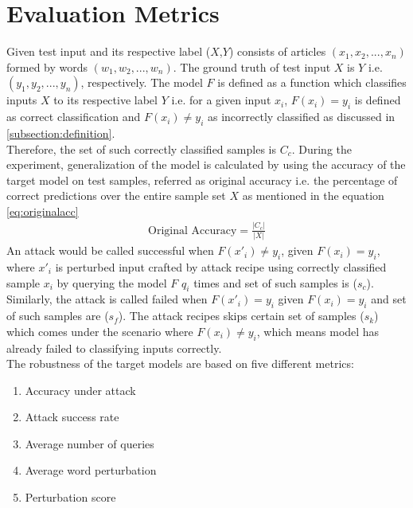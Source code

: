 \documentclass[%
	BCOR=8mm, %
	DIV=12,
	toc=bibliography, %
	toc=listof, %
	oneside, %
	egregdoesnotlikesansseriftitles, %
	]{scrbook}
\begin{document}
\section{Evaluation Metrics}
\label{section:metrics}
Given test input and its respective label ($X$,$Y$) consists of articles $(x_{1},x_{2},...,x_{n})$ formed by words $(w_{1},w_{2},...,w_{n})$. The ground truth of test input $X$ is $Y$ i.e. $(y_{1},y_{2},...,y_{n})$, respectively. The model $F$ is defined as a function which classifies inputs $X$ to its respective label $Y$ i.e. for a given input $x_{i}$, $F(x_{i})=y_{i}$ is defined as correct classification and $F(x_{i})\not=y_{i}$  as incorrectly classified as discussed in \ref{subsection:definition}. \\
Therefore, the set of such correctly classified samples is  $C_{c}$.  During the experiment, generalization of the model is calculated by using the accuracy of the target model on test samples, referred as original accuracy i.e. the percentage of correct predictions over the entire sample set $X$ as mentioned in the equation \ref{eq:originalacc} \\
 \begin{equation}
    \begin{aligned}
        \mbox{Original Accuracy}=\frac{|C_{c}|}{|X|} 
        \label{eq:originalacc}
    \end{aligned}
\end{equation}
An attack would be called successful when $F(x'_{i})\not=y_{i}$, given $F(x_{i})=y_{i}$, where $x'_{i}$ is perturbed input crafted by attack recipe using correctly classified sample $x_{i}$ by querying the model  $F$ $q_{i}$ times and set of such samples is ($s_{c}$). Similarly, the attack is called failed when $F(x'_{i})=y_{i}$ given $F(x_{i})=y_{i}$ and set of such samples are  ($s_{f}$). The attack recipes skips certain set of samples ($s_{k}$) which comes under the scenario where  $F(x_{i})\not=y_{i}$,  which means model has already failed to classifying inputs correctly.\\ 
 The robustness of the target models are based on five different metrics: 
\begin{enumerate}
    \item Accuracy under attack 
    \item Attack success rate
    \item Average number of queries
    \item Average word perturbation 
    \item Perturbation score
\end{enumerate}
\end{document}
